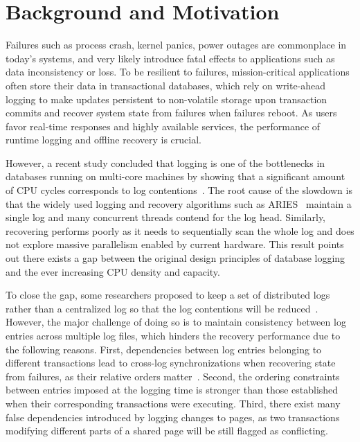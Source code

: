 \section{Background and Motivation}
\vspace{-.5em}
Failures such as process crash, kernel panics, power outages are commonplace in today's systems, and
very likely introduce fatal effects to applications such as data inconsistency or loss. 
To be resilient to failures, mission-critical applications often store their data in transactional databases, which rely on write-ahead logging to make updates persistent to non-volatile storage upon transaction commits and recover system state from failures when failures reboot. As users favor real-time responses and highly available services, the performance of runtime logging and offline recovery is crucial. 

However, a recent study concluded that logging is one of the bottlenecks in databases 
running on multi-core machines by showing that a significant amount of CPU cycles corresponds 
to log contentions~\cite{Wang2014DistLog}. The root cause of the slowdown is that the widely used logging and 
recovery algorithms such as ARIES~\cite{Mohan1992ARIES} maintain a single log and many concurrent threads contend for the log head. Similarly, recovering performs poorly as it needs to sequentially scan the whole log and does not explore massive parallelism enabled by current hardware. This result points out there exists a gap between the original design principles of database logging and the ever increasing CPU density and capacity. 

To close the gap, some researchers proposed to keep a set of distributed logs rather than a centralized log so that the log contentions will be reduced~\cite{Wang2014DistLog}. However, the major challenge of doing so is to maintain consistency between log entries across multiple log files, which hinders the recovery performance due to the following reasons. First, dependencies between log entries belonging to different transactions lead to cross-log synchronizations when recovering state from failures, as their relative orders matter~\cite{Johnson2012Scale}. Second, the ordering constraints between entries imposed at the logging time is stronger than those established when their corresponding transactions were executing. Third, there exist many false dependencies introduced by logging changes to pages, as two transactions modifying different parts of a shared page will be still flagged as conflicting. 

